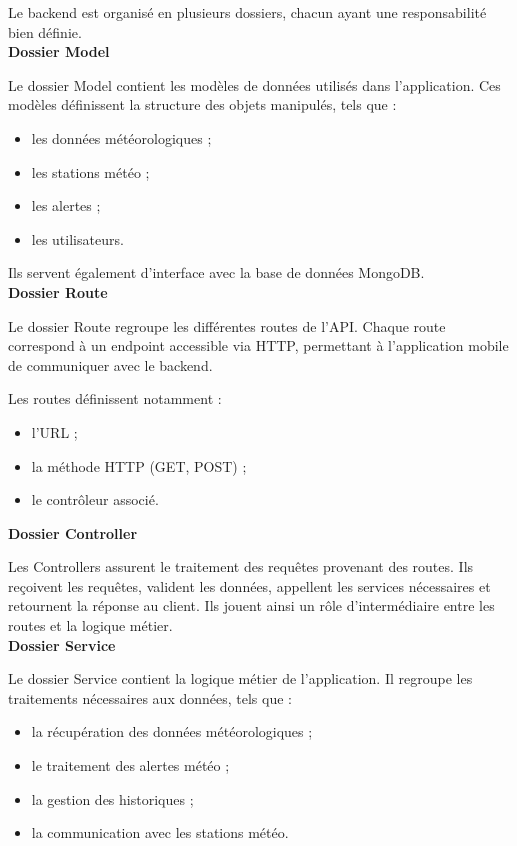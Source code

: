\noindent Le backend est organisé en plusieurs dossiers, chacun ayant une responsabilité bien définie.\\ 

\noindent \textbf{Dossier Model}  

\noindent Le dossier Model contient les modèles de données utilisés dans l’application. Ces modèles définissent la structure des objets manipulés, tels que :
\begin{itemize}
\item les données météorologiques ;
\item les stations météo ;
\item les alertes ;
\item les utilisateurs.
\end{itemize}

\noindent Ils servent également d’interface avec la base de données MongoDB.\\

\noindent \textbf{Dossier Route}  

\noindent Le dossier Route regroupe les différentes routes de l’API. Chaque route correspond à un endpoint accessible via HTTP, permettant à l’application mobile de communiquer avec le backend.

\noindent Les routes définissent notamment :
\begin{itemize}
\item l’URL ;
\item la méthode HTTP (GET, POST) ;
\item le contrôleur associé.\\
\end{itemize}


\noindent \textbf{Dossier Controller}  

\noindent Les Controllers assurent le traitement des requêtes provenant des routes. Ils reçoivent les requêtes, valident les données, appellent les services nécessaires et retournent la réponse au client. Ils jouent ainsi un rôle d’intermédiaire entre les routes et la logique métier.\\


\noindent \textbf{Dossier Service}  

\noindent Le dossier Service contient la logique métier de l’application. Il regroupe les traitements nécessaires aux données, tels que :
\begin{itemize}
\item la récupération des données météorologiques ;
\item le traitement des alertes météo ;
\item la gestion des historiques ;
\item la communication avec les stations météo.
\end{itemize}

